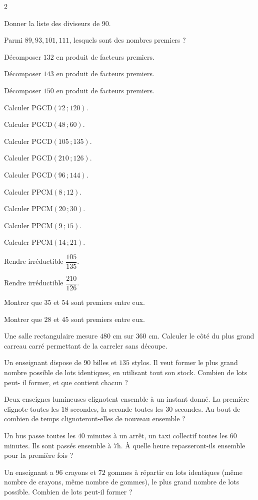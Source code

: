 \begin{multicols}{2}

\exo{} Donner la liste des diviseurs de $90$.

\exo{} Parmi $89,93,101,111$, lesquels sont des nombres premiers ?

\exo{} Décomposer $132$ en produit de facteurs premiers.

\exo{} Décomposer $143$ en produit de facteurs premiers.

\exo{} Décomposer $150$ en produit de facteurs premiers.

\exo{} Calculer $\text{PGCD}(72\,;120)$.

\exo{} Calculer $\text{PGCD}(48\,;60)$.

\exo{} Calculer $\text{PGCD}(105\,;135)$.

\exo{} Calculer $\text{PGCD}(210\,;126)$.

\exo{} Calculer $\text{PGCD}(96\,;144)$.

\exo{} Calculer $\text{PPCM}(8\,;12)$.

\exo{} Calculer $\text{PPCM}(20\,;30)$.

\exo{} Calculer $\text{PPCM}(9\,;15)$.

\exo{} Calculer $\text{PPCM}(14\,;21)$.

\exo{} Rendre irréductible $\dfrac{105}{135}$.

\exo{} Rendre irréductible $\dfrac{210}{126}$.

\exo{} Montrer que $35$ et $54$ sont premiers entre eux.

\exo{} Montrer que $28$ et $45$ sont premiers entre eux.

\exo{} Une salle rectangulaire mesure $480$ cm sur $360$ cm. Calculer le côté du
plus grand carreau carré permettant de la carreler sans découpe.

\exo{} Un enseignant dispose de $90$ billes et $135$ stylos. Il veut former le plus
grand nombre possible de lots identiques, en utilisant tout son stock. Combien de lots peut-
il former, et que contient chacun ?

\exo{} Deux enseignes lumineuses clignotent ensemble à un instant donné. La
première clignote toutes les $18$ secondes, la seconde toutes les $30$ secondes. Au bout de
combien de temps clignoteront-elles de nouveau ensemble ?

\exo{} Un bus passe toutes les $40$ minutes à un arrêt, un taxi collectif toutes les
$60$ minutes. Ils sont passés ensemble à $7$h. À quelle heure repasseront-ils ensemble pour
la première fois ?

\exo{} Un enseignant a $96$ crayons et $72$ gommes à répartir en lots identiques
(même nombre de crayons, même nombre de gommes), le plus grand nombre de lots possible.
Combien de lots peut-il former ?

\end{multicols}

